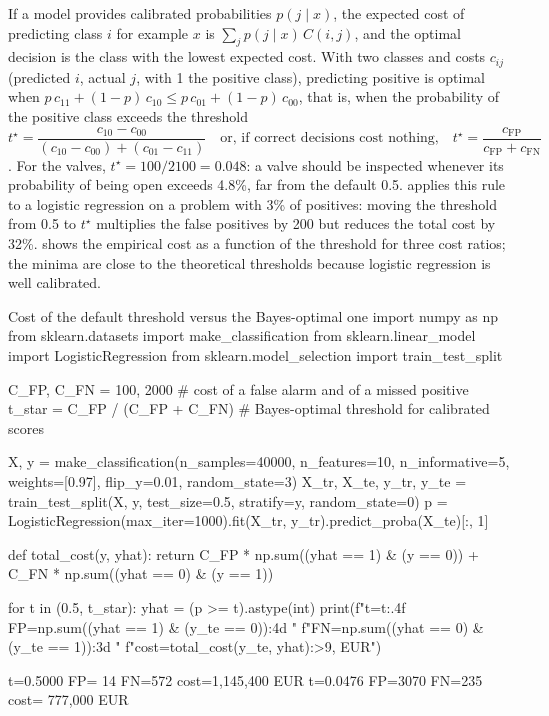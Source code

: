 If a model provides calibrated probabilities $p(j\mid x)$, the expected cost of predicting
class $i$ for example $x$ is $\sum_j p(j\mid x)\,C(i,j)$, and the optimal decision is the class
with the lowest expected cost. With two classes and costs $c_{ij}$ (predicted $i$, actual $j$,
with 1 the positive class), predicting positive is optimal when
$p\,c_{11}+(1-p)\,c_{10}\leq p\,c_{01}+(1-p)\,c_{00}$, that is, when the probability of the
positive class exceeds the threshold
\begin{equation}\label{eq:tstar}
  t^\star=\frac{c_{10}-c_{00}}{(c_{10}-c_{00})+(c_{01}-c_{11})}
  \quad\text{or, if correct decisions cost nothing,}\quad
  t^\star=\frac{c_{\mathrm{FP}}}{c_{\mathrm{FP}}+c_{\mathrm{FN}}}
\end{equation}
\citep{elkan2001foundations}. For the valves, $t^\star=100/2100=0.048$: a valve should be
inspected whenever its probability of being open exceeds 4.8\%, far from the default 0.5.
 applies this rule to a logistic regression on a problem with 3\% of
positives: moving the threshold from 0.5 to $t^\star$ multiplies the false positives by 200
but reduces the total cost by 32\%.  shows the empirical cost as a
function of the threshold for three cost ratios; the minima are close to the theoretical
thresholds because logistic regression is well calibrated.

\begin{pylisting}[label={lst:costthreshold}]{Cost of the default threshold versus the Bayes-optimal one}
import numpy as np
from sklearn.datasets import make_classification
from sklearn.linear_model import LogisticRegression
from sklearn.model_selection import train_test_split

C_FP, C_FN = 100, 2000           # cost of a false alarm and of a missed positive
t_star = C_FP / (C_FP + C_FN)    # Bayes-optimal threshold for calibrated scores

X, y = make_classification(n_samples=40000, n_features=10, n_informative=5,
                           weights=[0.97], flip_y=0.01, random_state=3)
X_tr, X_te, y_tr, y_te = train_test_split(X, y, test_size=0.5, stratify=y,
                                          random_state=0)
p = LogisticRegression(max_iter=1000).fit(X_tr, y_tr).predict_proba(X_te)[:, 1]

def total_cost(y, yhat):
    return C_FP * np.sum((yhat == 1) & (y == 0)) + C_FN * np.sum((yhat == 0) & (y == 1))

for t in (0.5, t_star):
    yhat = (p >= t).astype(int)
    print(f"t={t:.4f}  FP={np.sum((yhat == 1) & (y_te == 0)):4d}  "
          f"FN={np.sum((yhat == 0) & (y_te == 1)):3d}  "
          f"cost={total_cost(y_te, yhat):>9,} EUR")
\end{pylisting}
\begin{pyoutput}
t=0.5000  FP=  14  FN=572  cost=1,145,400 EUR
t=0.0476  FP=3070  FN=235  cost=  777,000 EUR
\end{pyoutput}

